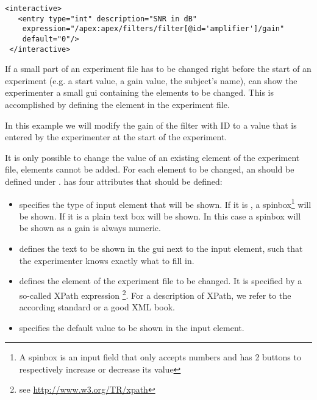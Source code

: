      



\begin{lstlisting}
<interactive>
   <entry type="int" description="SNR in dB"
    expression="/apex:apex/filters/filter[@id='amplifier']/gain"
    default="0"/>
 </interactive>
\end{lstlisting}

If a small part of an experiment file has to be changed right
before the start of an experiment (e.g. a start value, a gain
value, the subject's name), \apex can show the experimenter a
small \ac{gui} containing the elements to be changed. This is
accomplished by defining the  element in the
experiment file.

In this example we will modify the gain of the filter with ID
 to a value that is entered by the experimenter at
the start of the experiment.

It is only possible to change the value of an existing element of the experiment file, elements cannot be added. For each element to be changed, an  should be defined under .  has  four attributes that should be defined:

\begin{itemize}
\item {} specifies the type of input element that
will be shown. If it is , a spinbox\footnote{A spinbox is
an input field that only accepts numbers and has 2 buttons to
respectively increase or decrease its value} will be shown. If it
is  a plain text box will be shown. In this case a
spinbox will be shown as a gain is always numeric. \item
{} defines the text to be shown in the
\ac{gui} next to the input element, such that the experimenter
knows exactly what to fill in. \item {}
defines the element of the experiment file to be changed. It is
specified by a so-called XPath expression \footnote{see
\url{http://www.w3.org/TR/xpath}}. For a description of XPath, we
refer to the according standard or a good XML book.

 \item {} specifies the
default value to be shown in the input element.
\end{itemize}

  

